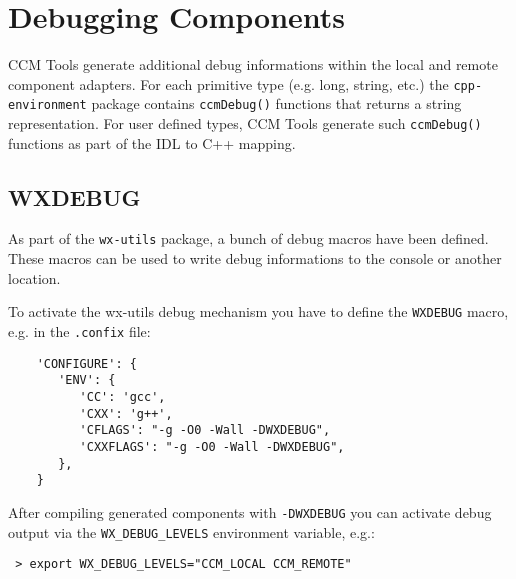 \section{Debugging Components}

CCM Tools generate additional debug informations within the local and
remote component adapters.
For each primitive type (e.g. long, string, etc.)
the {\tt cpp-environment} package contains {\tt ccmDebug()} 
functions that returns a string representation.
For user defined types, CCM Tools generate such {\tt ccmDebug()}
functions as part of the IDL to C++ mapping.   


\subsection{WXDEBUG}

As part of the {\tt wx-utils} package, a bunch of debug macros have been
defined. These macros can be used to write debug informations to the console
or another location.

To activate the wx-utils debug mechanism you have to define the {\tt WXDEBUG} 
macro, e.g. in the {\tt .confix} file:
\begin{verbatim} 
    'CONFIGURE': {
       'ENV': {
          'CC': 'gcc',
          'CXX': 'g++',      
          'CFLAGS': "-g -O0 -Wall -DWXDEBUG",
          'CXXFLAGS': "-g -O0 -Wall -DWXDEBUG",
       },
    }
\end{verbatim} 

After compiling generated components with {\tt -DWXDEBUG} you can activate
debug output via the {\tt WX\_DEBUG\_LEVELS} environment variable, e.g.:
\begin{verbatim} 
 > export WX_DEBUG_LEVELS="CCM_LOCAL CCM_REMOTE"
\end{verbatim} 

